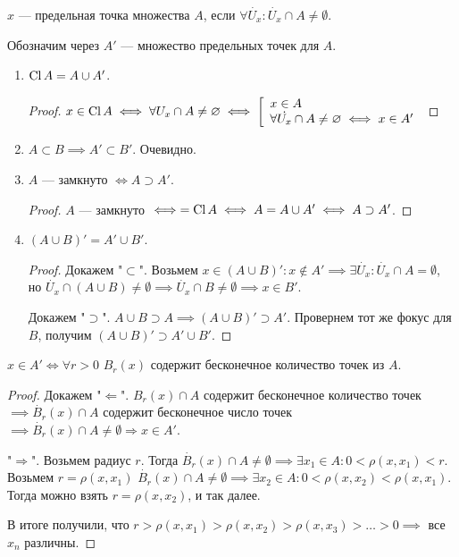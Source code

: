 \begin{definition}
    $x$ --- предельная точка множества  $A$, если  $\forall \dot{U_x}\!: \dot{U_x} \cap A \neq \emptyset$.

    Обозначим через  $A'$ --- множество предельных точек для  $A$.
\end{definition}
\begin{properties}
    \slashn
    \begin{enumerate}
        \item $\operatorname{Cl} A = A \cup A'$.
            \begin{proof}
                $x \in \operatorname{Cl} A \iff \forall U_x \cap A \neq \varnothing \iff \left[ \begin{array}{l} x \in A \\ \forall \dot{U_x} \cap A \neq \varnothing \iff x \in A' \end{array} \right.$
            \end{proof}
        \item $A \subset B \implies A' \subset B'$. Очевидно.
        \item  $A$ --- замкнуто  $\iff A \supset A'$. 
             \begin{proof}
                $A$ --- замкнуто  $\iff = \operatorname{Cl} A \iff A = A \cup A' \iff A \supset A'$.
            \end{proof}
        \item $(A \cup B)' = A' \cup B'$.
             \begin{proof}
                Докажем "$\subset$". Возьмем $x \in (A \cup B)'\!: x \notin A' \implies \exists \dot{U_x}\!: \dot{U_x} \cap A = \emptyset$, но $\dot{U_x} \cap (A \cup B) \neq \emptyset \implies \dot{U_x} \cap B \neq \emptyset \implies x \in B'$.

                Докажем "$\supset$". $A \cup B \supset A \implies (A \cup B)' \supset A'$. Провернем тот же фокус для  $B$, получим  $(A \cup B)' \supset A' \cup B'$.
           \end{proof}
    \end{enumerate}
\end{properties}
\begin{theorem}
    $x \in A' \iff \forall r > 0$  $B_r(x)$ содержит бесконечное количество точек из  $A$.
\end{theorem}
\begin{proof}
    Докажем "$\Leftarrow$". $B_r(x) \cap A$ содержит бесконечное количество точек  $\implies \dot{B_r}(x) \cap A$ содержит бесконечное число точек  $\implies \dot{B_r}(x) \cap A \neq \emptyset \Rightarrow x \in A'$.

     "$\Rightarrow$". Возьмем радиус  $r$. Тогда  $\dot{B_r}(x) \cap A \neq \emptyset \implies \exists x_1 \in A\!: 0 < \rho(x, x_1) < r$. Возьмем $r = \rho(x, x_1)$ $\dot{B_r}(x) \cap A \neq \emptyset \implies \exists x_2 \in A\!: 0 < \rho(x, x_2) < \rho(x, x_1)$. Тогда можно взять $r = \rho(x, x_2)$, и так далее. 

     В итоге получили, что $r > \rho(x, x_1) > \rho(x, x_2) > \rho(x, x_3) > \ldots > 0 \implies$ все $x_n$ различны.
\end{proof}
